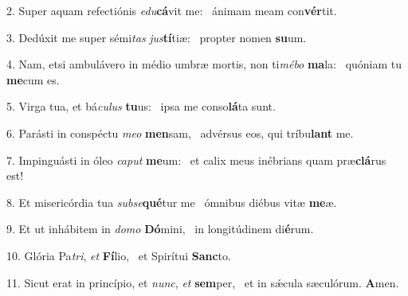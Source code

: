 2. Super aquam refectiónis \textit{e}\textit{du}\textbf{cá}vit me: \ast\  ánimam meam con\textbf{vér}tit.\

3. Dedúxit me super sémi\textit{tas} \textit{jus}\textbf{tí}tiæ: \ast\  propter nomen \textbf{su}um.\

4. Nam, etsi ambulávero in médio umbræ mortis, non ti\textit{mé}\textit{bo} \textbf{ma}la: \ast\  quóniam tu \textbf{me}cum es.\

5. Virga tua, et bá\textit{cu}\textit{lus} \textbf{tu}us: \ast\  ipsa me conso\textbf{lá}ta sunt.\

6. Parásti in conspéctu \textit{me}\textit{o} \textbf{men}sam, \ast\  advérsus eos, qui tríbu\textbf{lant} me.\

7. Impinguásti in óleo \textit{ca}\textit{put} \textbf{me}um: \ast\  et calix meus inébrians quam præ\textbf{clá}rus est!\

8. Et misericórdia tua \textit{sub}\textit{se}\textbf{qué}tur me \ast\  ómnibus diébus vitæ \textbf{me}æ.\

9. Et ut inhábitem in \textit{do}\textit{mo} \textbf{Dó}mini, \ast\  in longitúdinem di\textbf{é}rum.\

10. Glória Pa\textit{tri}, \textit{et} \textbf{Fí}lio, \ast\  et Spirítui \textbf{Sanc}to.\

11. Sicut erat in princípio, et \textit{nunc}, \textit{et} \textbf{sem}per, \ast\  et in sǽcula sæculórum. \textbf{A}men.\

